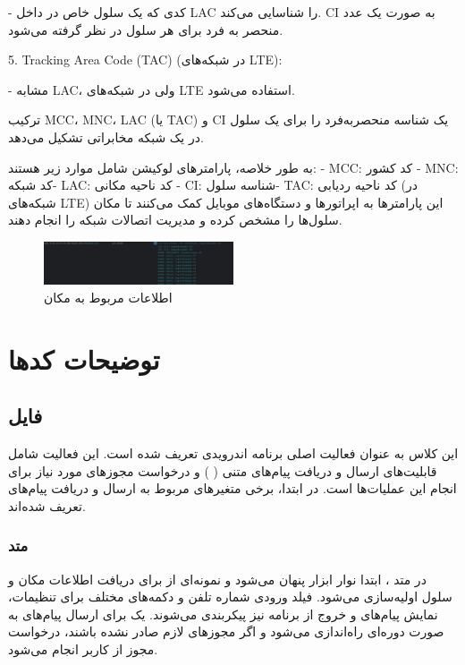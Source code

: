 \documentclass{report}
\begin{document}
- کدی که یک سلول خاص در داخل LAC را شناسایی می‌کند. CI به صورت یک عدد منحصر به فرد برای هر سلول در نظر گرفته می‌شود.

5. Tracking Area Code (TAC) (در شبکه‌های LTE): 

  - مشابه LAC، ولی در شبکه‌های LTE استفاده می‌شود.
  
ترکیب MCC، MNC، LAC (یا TAC) و CI یک شناسه منحصربه‌فرد را برای یک سلول در یک شبکه مخابراتی تشکیل می‌دهد.

به طور خلاصه، پارامترهای لوکیشن شامل موارد زیر هستند:
- MCC: کد کشور
- MNC: کد شبکه- LAC: کد ناحیه مکانی
- CI: شناسه سلول- TAC: کد ناحیه ردیابی (در شبکه‌های LTE)
این پارامترها به اپراتورها و دستگاه‌های موبایل کمک می‌کنند تا مکان سلول‌ها را مشخص کرده و مدیریت اتصالات شبکه را انجام دهند.

\begin{figure}[b]
	\centering
	\includegraphics[width=0.5\textwidth]{Pic/Loc}
	\caption{اطلاعات مربوط به مکان}
	\label{fig:loc}
\end{figure}

\chapter{توضیحات کدها}
\section{فایل
}
این کلاس
 به عنوان فعالیت اصلی برنامه اندرویدی تعریف شده است. این فعالیت شامل قابلیت‌های ارسال و دریافت پیام‌های متنی (
 ) و درخواست مجوزهای مورد نیاز برای انجام این عملیات‌ها است. در ابتدا، برخی متغیرهای مربوط به ارسال و دریافت پیام‌های
   تعریف شده‌اند.

\subsection{متد
}
در متد
 ، ابتدا نوار ابزار پنهان می‌شود و نمونه‌ای از
   برای دریافت اطلاعات مکان و سلول اولیه‌سازی می‌شود. فیلد ورودی شماره تلفن و دکمه‌های مختلف برای تنظیمات، نمایش پیام‌های 
    و خروج از برنامه نیز پیکربندی می‌شوند. یک
     برای ارسال پیام‌های 
      به صورت دوره‌ای راه‌اندازی می‌شود و اگر مجوزهای لازم صادر نشده باشند، درخواست مجوز از کاربر انجام می‌شود.
\end{document}
